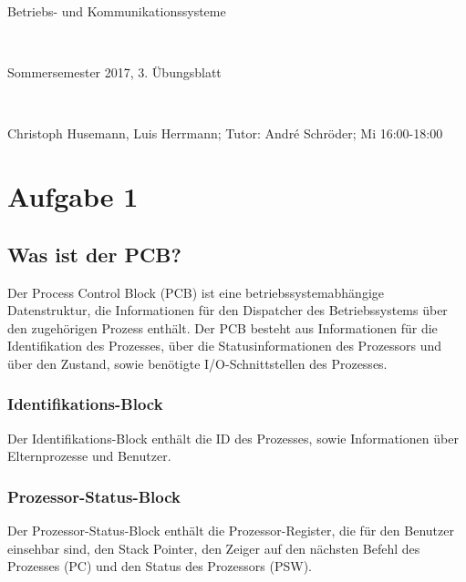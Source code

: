 \documentclass[numbers=noendperiod]{scrartcl}
\begin{document}
	
\newcommand{\inputmintedframed}[2]{
	\begin{mdframed}[linecolor=bg,backgroundcolor=bg]
		\inputminted[mathescape,breaklines,linenos,numbersep=5pt,tabsize=3]{#1}{#2}
	\end{mdframed}}
	
\hrulefill
\begin{center}
	\bfseries %
	\sffamily %
	\begin{huge}
		Betriebs- und Kommunikationssysteme
	\end{huge}\\
	\begin{Large}
		Sommersemester 2017, 3. Übungsblatt
	\end{Large}\\
	\begin{small}
		Christoph Husemann, Luis Herrmann; Tutor: André Schröder; Mi 16:00-18:00
	\end{small}
	
	\vspace{-10pt}
\end{center}
\hrulefill

\section{Aufgabe 1}
\subsection{Was ist der PCB?}
Der Process Control Block (PCB) ist eine betriebssystemabhängige Datenstruktur, die Informationen für den Dispatcher des Betriebssystems über den zugehörigen Prozess enthält. Der PCB besteht aus Informationen für die Identifikation des Prozesses, über die Statusinformationen des Prozessors und über den Zustand, sowie benötigte I/O-Schnittstellen des Prozesses.
\subsubsection{Identifikations-Block}
Der Identifikations-Block enthält die ID des Prozesses, sowie Informationen über Elternprozesse und Benutzer.
\subsubsection{Prozessor-Status-Block}
Der Prozessor-Status-Block enthält die Prozessor-Register, die für den Benutzer einsehbar sind, den Stack Pointer, den Zeiger auf den nächsten Befehl des Prozesses (PC) und den Status des Prozessors (PSW).
\end{document}
